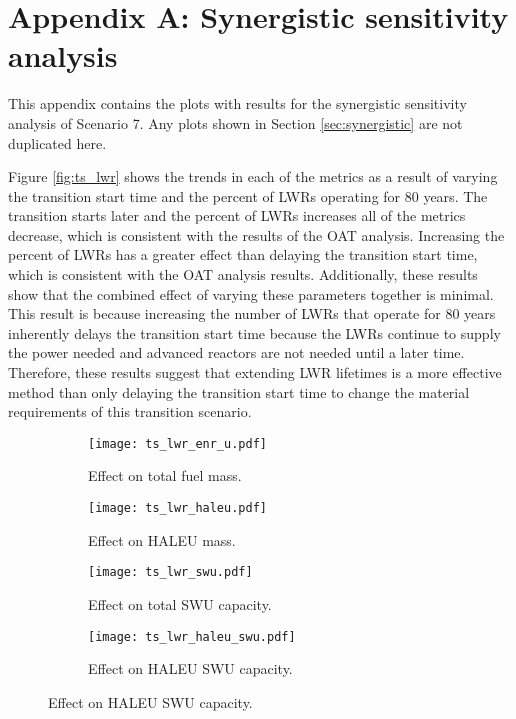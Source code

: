 \chapter{Appendix A: Synergistic sensitivity analysis}\label{app:s7_synergistic}
\renewcommand{\thetable}{A.\arabic{table}}
\setcounter{table}{0}
\renewcommand{\thefigure}{A.\arabic{figure}}
\setcounter{figure}{0}


This appendix contains the plots with results for the synergistic 
sensitivity analysis of Scenario 7. Any plots shown in Section 
\ref{sec:synergistic} are not duplicated here.

Figure \ref{fig:ts_lwr} shows the trends in each of the metrics as a result
of varying the transition start time and the percent of \glspl{LWR} 
operating for 80 years. The transition starts later and the percent of 
\glspl{LWR} increases all of the metrics decrease, which is consistent 
with the results of the \gls{OAT} analysis. Increasing the percent of 
\glspl{LWR} has a greater effect than delaying the transition start time, 
which is consistent with the \gls{OAT} analysis results.
Additionally, these results show that 
the combined effect of varying these parameters together is minimal. 
This result is because increasing the number of \glspl{LWR} that 
operate for 80 years inherently delays the transition start time 
because the \glspl{LWR} continue to supply the power needed and 
advanced reactors are not needed until a later time. Therefore, these 
results suggest that extending \gls{LWR} lifetimes is a more effective 
method than only delaying the transition start time to change the material 
requirements of this transition scenario. 

\begin{figure}
    \begin{subfigure}[t]{0.48\textwidth}
        \centering
        \texttt{[image: ts\_lwr\_enr\_u.pdf]}
        \caption{Effect on total fuel mass.}
        \label{fig:ts_lwr_enr_u}
    \end{subfigure}
    \hfill
    \begin{subfigure}[t]{0.48\textwidth}
        \centering
        \texttt{[image: ts\_lwr\_haleu.pdf]}
        \caption{Effect on HALEU mass.}
        \label{fig:ts_lwr_haleu}
    \end{subfigure}
    
    \begin{subfigure}[t]{0.48\textwidth}
        \centering
        \texttt{[image: ts\_lwr\_swu.pdf]}
        \caption{Effect on total SWU capacity.}
        \label{fig:ts_lwr_swu}
    \end{subfigure}
    \hfill
    \begin{subfigure}[t]{0.48\textwidth}
        \centering
        \texttt{[image: ts\_lwr\_haleu\_swu.pdf]}
        \caption{Effect on HALEU SWU capacity.}
        \label{fig:ts_lwr_haleu_swu}
    \end{subfigure}
\end{figure}

